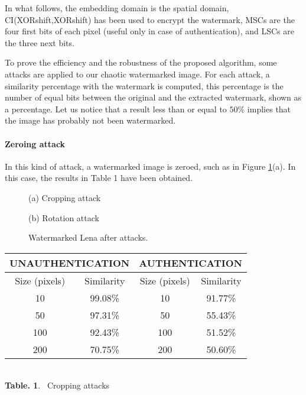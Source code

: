 \documentclass[journal]{IEEEtran}
\begin{document}
In what follows, the embedding domain is the spatial domain, CI(XORshift,XORshift) has been used to encrypt the watermark, MSCs are the four first bits of each pixel (useful only in case of authentication), and LSCs are the three next bits.

To prove the efficiency and the robustness of the proposed algorithm, some
attacks are applied to our chaotic watermarked image. For each attack, a
similarity percentage with the watermark is computed, this percentage is the
number of equal bits between the original and the extracted watermark, shown
as a percentage. Let us notice that a result less than or equal to $50\%$
implies that the image has probably not been watermarked.

\paragraph{Zeroing attack}

In this kind of attack, a watermarked image is zeroed, such as in Figure \ref{fig:LenaAttack}(a). In this case, the results in Table 1 have been obtained.

\begin{figure}[htb]
\begin{minipage}[b]{.48\linewidth}
  \centering
 \centerline{}
  \centerline{(a) Cropping attack}
\end{minipage}
\hfill
\begin{minipage}[b]{0.48\linewidth}
  \centering
 \centerline{}
  \centerline{(b) Rotation attack}
\end{minipage}
\caption{Watermarked Lena after attacks.}
\label{fig:LenaAttack}
\end{figure}




\begin{center}
\begin{footnotesize}
\begin{tabular}{|c|c||c|c|}
\hline
\multicolumn{2}{|c||}{UNAUTHENTICATION}  & \multicolumn{2}{c|}{AUTHENTICATION}\\ 
\hline
Size (pixels) & Similarity & Size (pixels) & Similarity \\
 \hline
10 & 99.08\% & 10 & 91.77\% \\
50 & 97.31\% & 50 & 55.43\% \\
100 & 92.43\% & 100 & 51.52\% \\
200 & 70.75\% & 200 & 50.60\% \\
\hline
\end{tabular}
\end{footnotesize}\\
\vspace{0.5cm}
\textbf{Table. 1}. ~Cropping attacks
\end{center}
\end{document}
